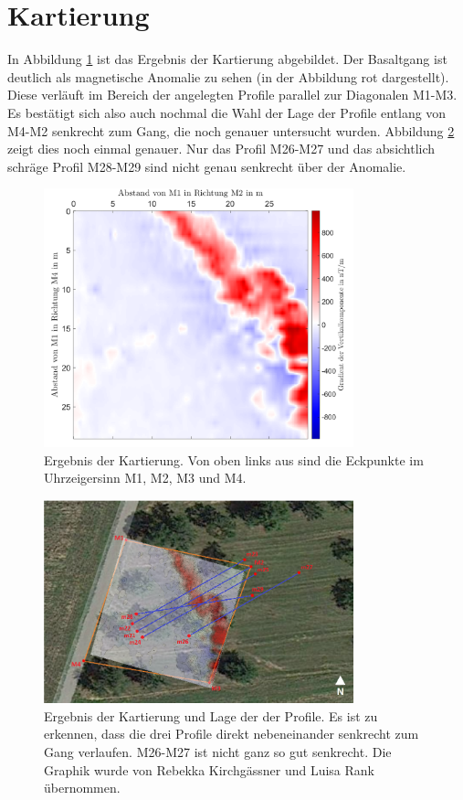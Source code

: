 \section{Kartierung}

In Abbildung \ref{fig:Kartierung} ist das Ergebnis der Kartierung abgebildet. Der Basaltgang ist deutlich als magnetische Anomalie zu sehen (in der Abbildung rot dargestellt). Diese verläuft im Bereich der angelegten Profile parallel zur Diagonalen M1-M3. Es bestätigt sich also auch nochmal die Wahl der Lage der Profile entlang von M4-M2 senkrecht zum Gang, die noch genauer untersucht wurden. Abbildung \ref{fig:MagnetikGesamtueberblick} zeigt dies noch einmal genauer. Nur das Profil M26-M27 und das absichtlich schräge Profil M28-M29 sind nicht genau senkrecht über der Anomalie.

\begin{figure}[!ht]
 \centering
 \includegraphics[width=0.8\textwidth]{fig/kartierung_verschwommen.png}
 \caption[Ergebnis der Kartierung]{Ergebnis der Kartierung. Von oben links aus sind die Eckpunkte im Uhrzeigersinn M1, M2, M3 und M4.}
 \label{fig:Kartierung}
\end{figure}

\begin{figure}[!ht]
 \centering
 \includegraphics[width=0.8\textwidth]{fig/MagnetikGesamtueberblick}
 \caption[Ergebnis der Kartierung und Lage der der Profile]{Ergebnis der Kartierung und Lage der der Profile. Es ist zu erkennen, dass die drei Profile direkt nebeneinander senkrecht zum Gang verlaufen. M26-M27 ist nicht ganz so gut senkrecht. Die Graphik wurde von Rebekka Kirchgässner und Luisa Rank übernommen.}
 \label{fig:MagnetikGesamtueberblick}
\end{figure}

